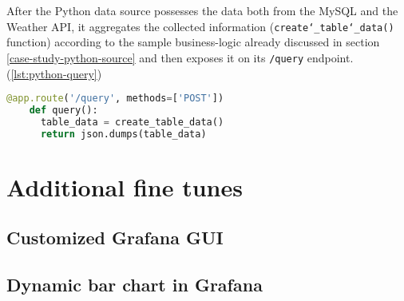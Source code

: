 After the Python data source possesses the data both from the MySQL and the Weather API, it aggregates the collected information (\texttt{create\char`_table\char`_data()} function) according to the sample business-logic already discussed in section \ref{case-study-python-source} and then exposes it on its \texttt{/query} endpoint. (\ref{lst:python-query})

\begin{minipage}[b]{\linewidth}
	\centering
	\begin{lstlisting}[language=Python, frame=single, mathescape,%
	caption={Exposing the prepared data}, label=lst:python-query]
	@app.route('/query', methods=['POST'])
	def query():
	  table_data = create_table_data()
	  return json.dumps(table_data)
	\end{lstlisting}
\end{minipage}


\section{Additional fine tunes}

\subsection{Customized Grafana GUI}

\subsection{Dynamic bar chart in Grafana}